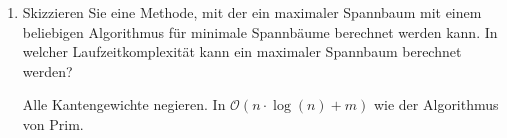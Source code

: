 \documentclass{bschlangaul-aufgabe}
\begin{document}
\begin{enumerate}
\begin{bAntwort}
\end{bAntwort}


\item Skizzieren Sie eine Methode, mit der ein maximaler Spannbaum mit
einem beliebigen Algorithmus für minimale Spannbäume berechnet werden
kann. In welcher Laufzeitkomplexität kann ein maximaler Spannbaum
berechnet werden?

\begin{bAntwort}
Alle Kantengewichte negieren. In $\mathcal{O}(n \cdot \log(n) + m)$ wie
der Algorithmus von Prim.
\end{bAntwort}
\end{enumerate}
\end{document}
